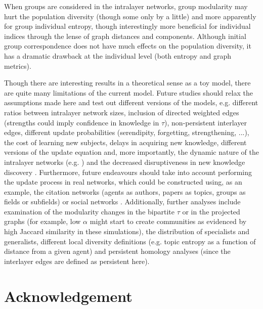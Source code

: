 \documentclass{svproc}
\begin{document}
When groups are considered in the intralayer networks, group modularity may hurt the population diversity (though some only by a little) and more apparently for group individual entropy, though interestingly more beneficial for individual indices through the lense of graph distances and components. Although initial group correspondence does not have much effects on the population diversity, it has a dramatic drawback at the individual level (both entropy and graph metrics).


Though there are interesting results in a theoretical sense as a toy model, there are quite many limitations of the current model. Future studies should relax the assumptions made here and test out different versions of the models, e.g. different ratios between intralayer network sizes, inclusion of directed weighted edges (strengths could imply confidence in knowledge in $\tau$), non-persistent interlayer edges, different update probabilities (serendipity, forgetting, strengthening, ...), the cost of learning new subjects, delays in acquiring new knowledge, different versions of the update equation and, more importantly, the dynamic nature of the intralayer networks (e.g. \cite{Sun2020-qj}) and the decreased disruptiveness in new knowledge discovery \cite{Park2021-jb}. Furthermore, future endeavours should take into account performing the update process in real networks, which could be constructed using, as an example, the citation networks (agents as authors, papers as topics, groups as fields or subfields) or social networks \cite{Weng2015-zt}. Additionally, further analyses include examination of the modularity changes in the bipartite $\tau$ \cite{Dankulov2015-uv} or in the projected graphs (for example, low $\alpha$ might start to create communities as evidenced by high Jaccard similarity in these simulations), the distribution of specialists and generalists, different local diversity definitions (e.g. topic entropy as a function of distance from a given agent) and persistent homology analyses (since the interlayer edges are defined as persistent here).

\section{Acknowledgement}
\end{document}
